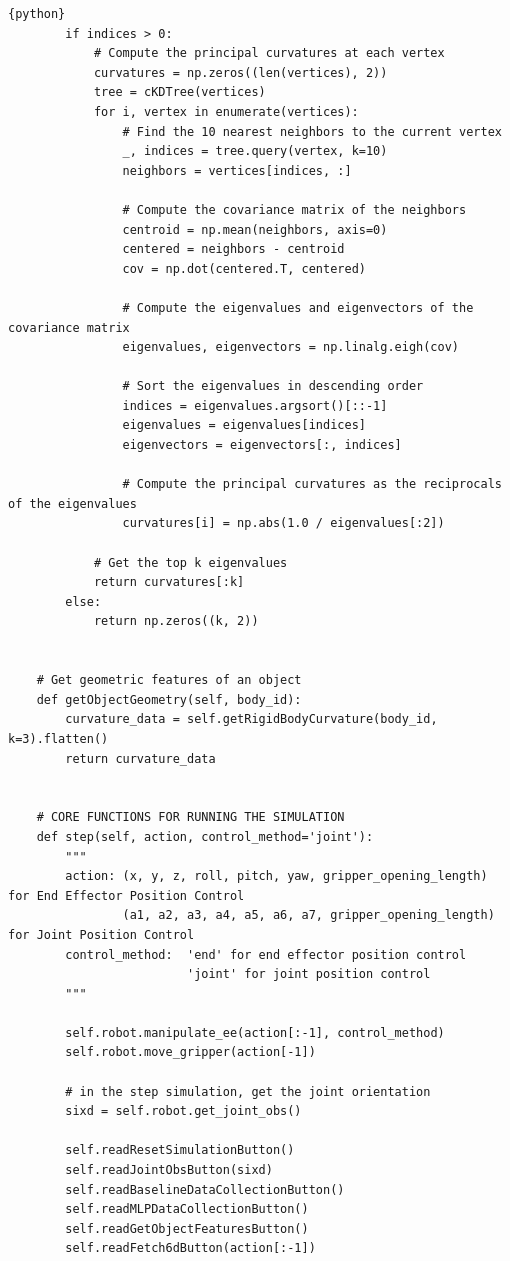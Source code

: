\documentclass[11pt, a4paper]{report}
\begin{document}
\begin{lstlisting}{python}
        if indices > 0:
            # Compute the principal curvatures at each vertex
            curvatures = np.zeros((len(vertices), 2))
            tree = cKDTree(vertices)
            for i, vertex in enumerate(vertices):
                # Find the 10 nearest neighbors to the current vertex
                _, indices = tree.query(vertex, k=10)
                neighbors = vertices[indices, :]

                # Compute the covariance matrix of the neighbors
                centroid = np.mean(neighbors, axis=0)
                centered = neighbors - centroid
                cov = np.dot(centered.T, centered)

                # Compute the eigenvalues and eigenvectors of the covariance matrix
                eigenvalues, eigenvectors = np.linalg.eigh(cov)

                # Sort the eigenvalues in descending order
                indices = eigenvalues.argsort()[::-1]
                eigenvalues = eigenvalues[indices]
                eigenvectors = eigenvectors[:, indices]

                # Compute the principal curvatures as the reciprocals of the eigenvalues
                curvatures[i] = np.abs(1.0 / eigenvalues[:2])
            
            # Get the top k eigenvalues
            return curvatures[:k]
        else:
            return np.zeros((k, 2))
    

    # Get geometric features of an object
    def getObjectGeometry(self, body_id):
        curvature_data = self.getRigidBodyCurvature(body_id, k=3).flatten()
        return curvature_data


    # CORE FUNCTIONS FOR RUNNING THE SIMULATION
    def step(self, action, control_method='joint'):
        """
        action: (x, y, z, roll, pitch, yaw, gripper_opening_length) for End Effector Position Control
                (a1, a2, a3, a4, a5, a6, a7, gripper_opening_length) for Joint Position Control
        control_method:  'end' for end effector position control
                         'joint' for joint position control
        """

        self.robot.manipulate_ee(action[:-1], control_method)
        self.robot.move_gripper(action[-1])

        # in the step simulation, get the joint orientation
        sixd = self.robot.get_joint_obs()

        self.readResetSimulationButton()
        self.readJointObsButton(sixd)
        self.readBaselineDataCollectionButton()
        self.readMLPDataCollectionButton()
        self.readGetObjectFeaturesButton()
        self.readFetch6dButton(action[:-1])
        

\end{lstlisting}
\end{document}
